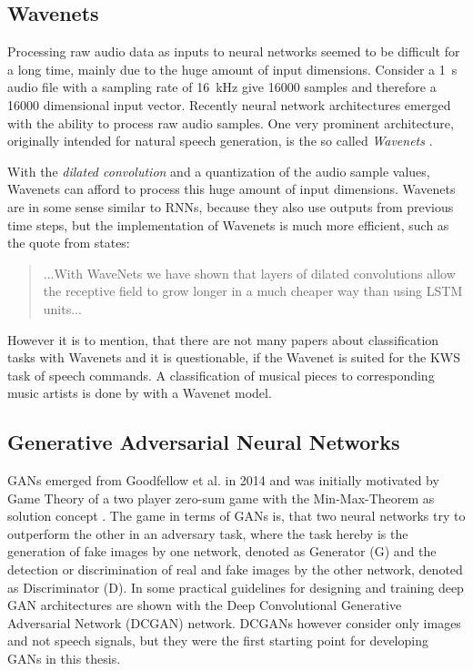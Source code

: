 \subsection{Wavenets}\label{sec:prev_nn_wavenet}
Processing raw audio data as inputs to neural networks seemed to be difficult for a long time, mainly due to the huge amount of input dimensions.
Consider a \SI{1}{\second} audio file with a sampling rate of \SI{16}{\kilo\hertz} give 16000 samples and therefore a 16000 dimensional input vector.
Recently neural network architectures emerged with the ability to process raw audio samples.
One very prominent architecture, originally intended for natural speech generation, is the so called \emph{Wavenets} \cite{Oord2016}.

With the \emph{dilated convolution} and a quantization of the audio sample values, Wavenets can afford to process this huge amount of input dimensions.
Wavenets are in some sense similar to RNNs, because they also use outputs from previous time steps, but the implementation of Wavenets is much more efficient, such as the quote from \cite{Oord2016} states:
\begin{quote}
  ...With WaveNets we have shown that layers of dilated convolutions allow the receptive field to grow longer in a much cheaper way than using LSTM units...
\end{quote}
However it is to mention, that there are not many papers about classification tasks with Wavenets and it is questionable, if the Wavenet is suited for the KWS task of speech commands.
A classification of musical pieces to corresponding music artists is done by \cite{Zhang2020} with a Wavenet model.



\subsection{Generative Adversarial Neural Networks}\label{sec:prev_nn_adv}
GANs emerged from Goodfellow et al. in 2014 \cite{Goodfellow2014} and was initially motivated by Game Theory of a two player zero-sum game with the Min-Max-Theorem as solution concept \cite{VonNeumann1944}.
The game in terms of GANs is, that two neural networks try to outperform the other in an adversary task, where the task hereby is the generation of fake images by one network, denoted as Generator (G) and the detection or discrimination of real and fake images by the other network, denoted as Discriminator (D).
In \cite{Radford2016} some practical guidelines for designing and training deep GAN architectures are shown with the Deep Convolutional Generative Adversarial Network (DCGAN) network.
DCGANs however consider only images and not speech signals, but they were the first starting point for developing GANs in this thesis.

